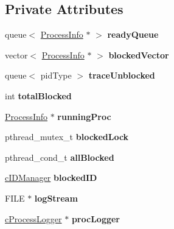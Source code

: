 \subsection*{\-Private \-Attributes}
\begin{DoxyCompactItemize}
\item 
\hypertarget{classcFCFS_afebe08e2ae6dc564b5aad24e3b30f842}{queue$<$ \hyperlink{structProcessInfo}{\-Process\-Info} $\ast$ $>$ {\bfseries ready\-Queue}}\label{d6/dc3/classcFCFS_afebe08e2ae6dc564b5aad24e3b30f842}

\item 
\hypertarget{classcFCFS_a1353ba13053c744e539b72ae06f0bf31}{vector$<$ \hyperlink{structProcessInfo}{\-Process\-Info} $\ast$ $>$ {\bfseries blocked\-Vector}}\label{d6/dc3/classcFCFS_a1353ba13053c744e539b72ae06f0bf31}

\item 
\hypertarget{classcFCFS_a94e258d1237eaf14679bb557b22a4cbd}{queue$<$ pid\-Type $>$ {\bfseries trace\-Unblocked}}\label{d6/dc3/classcFCFS_a94e258d1237eaf14679bb557b22a4cbd}

\item 
\hypertarget{classcFCFS_a71011b9c0dc2c005356ff183c057e538}{int {\bfseries total\-Blocked}}\label{d6/dc3/classcFCFS_a71011b9c0dc2c005356ff183c057e538}

\item 
\hypertarget{classcFCFS_a6ba522300c166895a7db48d7ab918b4e}{\hyperlink{structProcessInfo}{\-Process\-Info} $\ast$ {\bfseries running\-Proc}}\label{d6/dc3/classcFCFS_a6ba522300c166895a7db48d7ab918b4e}

\item 
\hypertarget{classcFCFS_ac5c0a078ed1168066d8f82c03c65d4ed}{pthread\-\_\-mutex\-\_\-t {\bfseries blocked\-Lock}}\label{d6/dc3/classcFCFS_ac5c0a078ed1168066d8f82c03c65d4ed}

\item 
\hypertarget{classcFCFS_aeb0c28f6c914a52ef0c40acf864bdb18}{pthread\-\_\-cond\-\_\-t {\bfseries all\-Blocked}}\label{d6/dc3/classcFCFS_aeb0c28f6c914a52ef0c40acf864bdb18}

\item 
\hypertarget{classcFCFS_a1cc5fa525a8adb5826dd1dedebd2ff6b}{\hyperlink{classcIDManager}{c\-I\-D\-Manager} {\bfseries blocked\-I\-D}}\label{d6/dc3/classcFCFS_a1cc5fa525a8adb5826dd1dedebd2ff6b}

\item 
\hypertarget{classcFCFS_a220459254463daf9a8ff8d017740fc79}{\-F\-I\-L\-E $\ast$ {\bfseries log\-Stream}}\label{d6/dc3/classcFCFS_a220459254463daf9a8ff8d017740fc79}

\item 
\hypertarget{classcFCFS_aa65684700e81cfa01808cbfdbe62e3d6}{\hyperlink{classcProcessLogger}{c\-Process\-Logger} $\ast$ {\bfseries proc\-Logger}}\label{d6/dc3/classcFCFS_aa65684700e81cfa01808cbfdbe62e3d6}

\end{DoxyCompactItemize}


